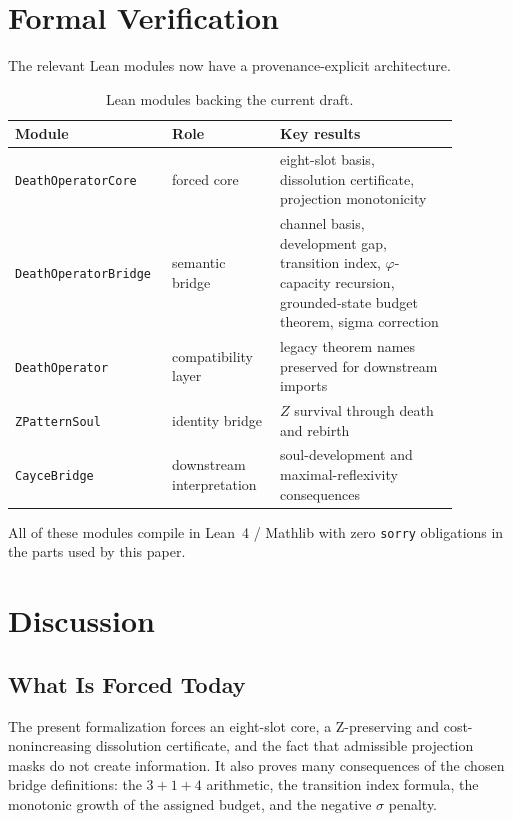 \documentclass[11pt,a4paper]{article}
\theoremstyle{definition}
\newcommand{\phig}{\varphi}
\newcommand{\Zp}{Z}
\newcommand{\code}[1]{\texttt{\small #1}}
\begin{document}
\section{Formal Verification}
\label{sec:formal}

The relevant Lean modules now have a provenance-explicit architecture.

\begin{table}[h]
\centering\small
\caption{Lean modules backing the current draft.}
\label{tab:lean}
\begin{tabular}{p{0.27\linewidth}p{0.23\linewidth}p{0.38\linewidth}}
\toprule
\textbf{Module} & \textbf{Role} & \textbf{Key results} \\
\midrule
\code{DeathOperatorCore} & forced core &
eight-slot basis, dissolution certificate, projection monotonicity \\
\code{DeathOperatorBridge} & semantic bridge &
channel basis, development gap, transition index, $\phig$-capacity recursion,
grounded-state budget theorem, sigma correction \\
\code{DeathOperator} & compatibility layer &
legacy theorem names preserved for downstream imports \\
\code{ZPatternSoul} & identity bridge &
$\Zp$ survival through death and rebirth \\
\code{CayceBridge} & downstream interpretation &
soul-development and maximal-reflexivity consequences \\
\bottomrule
\end{tabular}
\end{table}

All of these modules compile in Lean~4 / Mathlib with zero
\texttt{sorry} obligations in the parts used by this paper.

\section{Discussion}
\label{sec:discussion}

\subsection{What Is Forced Today}

The present formalization forces an eight-slot core, a Z-preserving and
cost-nonincreasing dissolution certificate, and the fact that admissible
projection masks do not create information.  It also proves many consequences
of the chosen bridge definitions: the $3+1+4$ arithmetic, the transition
index formula, the monotonic growth of the assigned budget, and the negative
$\sigma$ penalty.
\end{document}
